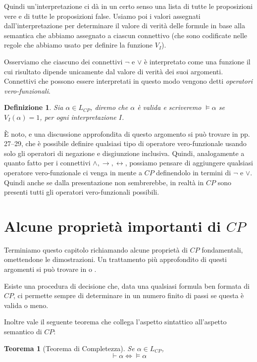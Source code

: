 \documentclass[a4paper, titlepage, 12pt]{report}
\newtheorem{theorem}{Teorema}[chapter]
\newtheorem{definition}{Definizione}[chapter]
\begin{document}
Quindi un'interpretazione ci dà in un certo senso una lista di tutte le proposizioni
vere e di tutte le proposizioni false.
Usiamo poi i valori assegnati dall'interpretazione per determinare il valore di verità delle formule
in base alla semantica che abbiamo assegnato a ciascun connettivo (che sono codificate nelle regole
che abbiamo usato per definire la funzione $V_I$).

Osserviamo che ciascuno dei connettivi $\neg$ e $\lor$
è interpretato come una funzione il cui risultato
dipende unicamente dal valore di verità dei suoi argomenti.
Connettivi che possono essere interpretati in questo modo
vengono detti \emph{operatori vero-funzionali}.

\begin{definition}
Sia $\alpha \in L_{CP}$, diremo che $\alpha$ è valida e scriveremo $\vDash \alpha$ se
$V_I(\alpha) = 1$, per ogni interpretazione $I$.
\end{definition}

È noto, e una discussione approfondita di questo argomento si può trovare in \cite{Mendelson}
pp. 27--29,
che è possibile definire qualsiasi tipo di operatore vero-funzionale usando
solo gli operatori di negazione e disgiunzione inclusiva.
Quindi, analogamente a quanto fatto per i connettivi $\land, \rightarrow, \leftrightarrow$,
possiamo pensare di aggiungere qualsiasi operatore vero-funzionale ci venga in mente
a $CP$ definendolo in termini di $\neg$ e $\lor$.
Quindi anche se dalla presentazione non sembrerebbe, in realtà in $CP$ sono presenti
tutti gli operatori vero-funzionali possibili.

\section{Alcune proprietà importanti di $CP$}

Terminiamo questo capitolo richiamando alcune proprietà di $CP$ fondamentali, omettendone
le dimostrazioni. Un trattamento più approfondito di questi argomenti si può trovare in
\cite{Tortora} o \cite{Mendelson}.

Esiste una procedura di decisione che, data una qualsiasi formula ben formata di $CP$,
ci permette sempre di determinare in un numero finito di passi se questa è valida o meno.

Inoltre vale il seguente teorema che collega l'aspetto sintattico all'aspetto semantico
di $CP$:

\begin{theorem}[Teorema di Completezza]
Se $\alpha \in L_{CP}$,
$$\vdash \alpha \Leftrightarrow \vDash \alpha$$
\end{theorem}
\end{document}
